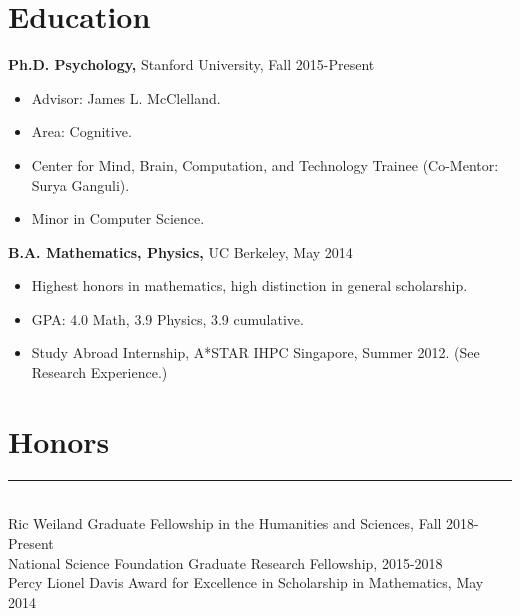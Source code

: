 \documentclass[margin]{res}
\begin{document}
 
 
 
\address{{\bf Address} \\ Department of Psychology \\ Stanford University \\ 450 Serra Mall \\ Stanford, CA 94305}
\address{{\bf Contact Information} \\ lampinen@stanford.edu \\\url{web.stanford.edu/~lampinen}}
\begin{resume} 
\section{Education} 
{\bf Ph.D. Psychology,} Stanford University, Fall 2015-Present
\begin{itemize} \itemsep -2pt \item Advisor: James L. McClelland. \item Area: Cognitive. \item Center for Mind, Brain, Computation, and Technology Trainee (Co-Mentor: Surya Ganguli). \item Minor in Computer Science.\end{itemize}
{\bf B.A. Mathematics, Physics,} UC Berkeley, May 2014 \begin{itemize} \itemsep -2pt \item Highest honors in mathematics, high distinction in general scholarship. \item GPA: 4.0 Math, 3.9 Physics, 3.9 cumulative. \item Study Abroad Internship, A*STAR IHPC Singapore, Summer 2012. (See Research Experience.) \end{itemize}
\vspace{1pt}\section{Honors} \vspace{-15pt} \rule{\textwidth}{0.5pt} \\[3pt]
Ric Weiland Graduate Fellowship in the Humanities and Sciences, Fall 2018-Present \\
National Science Foundation Graduate Research Fellowship, 2015-2018 \\
Percy Lionel Davis Award for Excellence in Scholarship in Mathematics, May 2014 \\ 

\end{resume}
\end{document}
